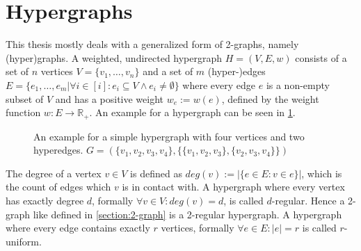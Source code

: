 \section{Hypergraphs} \label{section:hypergraphs}
This thesis mostly deals with a generalized form of 2-graphs, namely (hyper)graphs.
A weighted, undirected hypergraph $H = (V, E, w)$ consists of a set of $n$ vertices $V = \{v_1, \ldots, v_n\}$ and a set of $m$ (hyper-)edges $E = \{ e_1, \ldots , e_m | \forall i \in [i]: e_i \subseteq V \land e_i \neq \emptyset \} $ where every edge $e$ is a non-empty subset of $V$ and has a positive weight $w_e:= w(e) $, defined by the weight function $w: E \to  \mathbb{R}_+ $. An example for a hypergraph can be seen in \cref{fig:exapmlehypergraph}.



	
\begin{figure} [htpb]
	\centering
	\caption[Example hypergraph]{An example for a simple hypergraph with four vertices and two hyperedges. $G=(\{v_1, v_2, v_3, v_4\},\{\{v_1, v_2, v_3\}, \{v_2,v_3, v_4\}\} )$}\label{fig:exapmlehypergraph}
\end{figure}


The degree of a vertex $v\in V$ is defined as $deg(v) := |\{e\in E: v\in e\}|$, which is the count of edges which $v$ is in contact with.
A hypergraph where every vertex has exactly degree $d$, formally $\forall v\in V : deg(v) =d $,  is called $d$-regular. Hence a 2-graph like defined in \cref{section:2-graph} is a 2-regular hypergraph.
A hypergraph where every edge contains exactly $r$ vertices, formally $\forall e\in E : |e| =r $ is called $r$-uniform.

